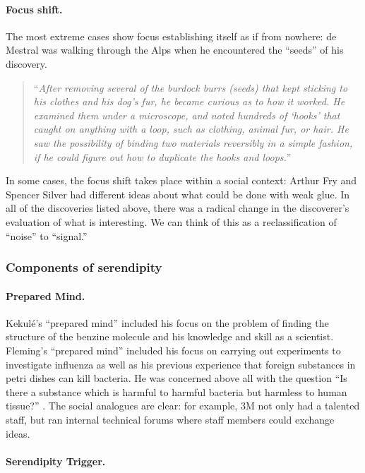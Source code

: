\paragraph{Focus shift.}
The most extreme cases show focus establishing itself as if from
nowhere: de Mestral was walking through the Alps when he encountered
the ``seeds'' of his discovery.
\begin{quote}
``\emph{After removing several of the burdock burrs (seeds) that kept sticking to his clothes and his dog's fur, he became curious as to how it worked. He examined them under a microscope, and noted hundreds of `hooks' that caught on anything with a loop, such as clothing, animal fur, or hair. He saw the possibility of binding two materials reversibly in a simple fashion, if he could figure out how to duplicate the hooks and loops.}''~\cite{wiki:velcro}
\end{quote}
In some cases, the focus shift takes place within a social context:
Arthur Fry and Spencer Silver had different ideas about what could be
done with weak glue.
%
In all of the discoveries listed above, there was a radical change in
the discoverer's evaluation of what is interesting.  We can think of
this as a reclassification of ``noise'' to ``signal.''

\subsubsection*{Components of serendipity}

\paragraph{Prepared Mind.}

Kekul\'e's ``prepared mind'' included his focus on the problem of
finding the structure of the benzine molecule and his knowledge and
skill as a scientist.  Fleming's ``prepared mind'' included his focus
on carrying out experiments to investigate influenza as well as his
previous experience that foreign substances in petri dishes can kill
bacteria.  He was concerned above all with the question ``Is there a
substance which is harmful to harmful bacteria but harmless to human
tissue?''  \cite[p. 161]{roberts}.  The social analogues are clear:
for example, 3M not only had a talented staff, but ran internal
technical forums where staff members could exchange ideas.
 
\paragraph{Serendipity Trigger.}

